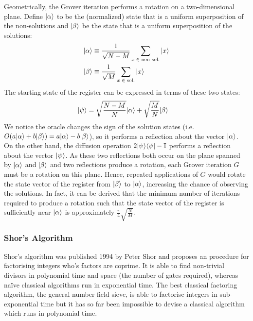 \documentclass[bibliography=totocnumbered, 10pt]{article}
\theoremstyle{NoticeStyle}
\begin{document}
\begin{itemize}
Geometrically, the Grover iteration performs a rotation on a two-dimensional plane. Define ${\left\vert{\alpha}\right\rangle}$ to be the (normalized) state that is a uniform superposition of the non-solutions and ${\left\vert{\beta}\right\rangle}$ be the state that is a uniform superposition of the solutions:
\begin{align}
	{\left\vert{\alpha}\right\rangle} &\equiv \frac{1}{\sqrt{N-M}} \sum_{x \; \in \;\textrm{non sol.}} {\left\vert{x}\right\rangle}\\
	{\left\vert{\beta}\right\rangle} &\equiv \frac{1}{\sqrt{M}} \sum_{x \; \in \; \textrm{sol.}} {\left\vert{x}\right\rangle}
\end{align}
The starting state of the register can be expressed in terms of these two states:
\begin{align}
	{\left\vert{\psi}\right\rangle} &= \sqrt{\frac{N-M}{N}}{\left\vert{\alpha}\right\rangle} +\sqrt{\frac{M}{N}}{\left\vert{\beta}\right\rangle}
\end{align}
We notice the oracle changes the sign of the solution states (i.e. $O(a{\left\vert{\alpha}\right\rangle} + b{\left\vert{\beta}\right\rangle}) = a{\left\vert{\alpha}\right\rangle} - b{\left\vert{\beta}\right\rangle}$), so it performs a reflection about the vector ${\left\vert{\alpha}\right\rangle}$. On the other hand, the diffusion operation $2{\left\vert{\psi}\right\rangle}{\left\langle{\psi}\right\vert} - \mathbb{I}$ performs a reflection about the vector ${\left\vert{\psi}\right\rangle}$. As these two reflections both occur on the plane spanned by ${\left\vert{\alpha}\right\rangle}$ and ${\left\vert{\beta}\right\rangle}$ and two reflections produce a rotation, each Grover iteration $G$ must be a rotation on this plane. Hence, repeated applications of $G$ would rotate the state vector of the register from ${\left\vert{\beta}\right\rangle}$ to ${\left\vert{\alpha}\right\rangle}$, increasing the chance of observing the solutions. In fact, it can be derived that the minimum number of iterations required to produce a rotation such that the state vector of the register is sufficiently near ${\left\vert{\alpha}\right\rangle}$ is approximately $\frac{\pi}{4} \sqrt{\frac{N}{M}}$. 


\end{itemize}


\subsubsection{Shor's Algorithm}
Shor's algorithm was published 1994 by Peter Shor and proposes an procedure for factorising integers who's factors are coprime. It is able to find non-trivial divisors in polynomial time and space (the number of gates required), whereas na\"ive classical algorithms run in exponential time. The best classical factoring algorithm, the general number field sieve, is able to factorise integers in sub-exponential time but it has so far been impossible to devise a classical algorithm which runs in polynomial time. 
\end{document}
